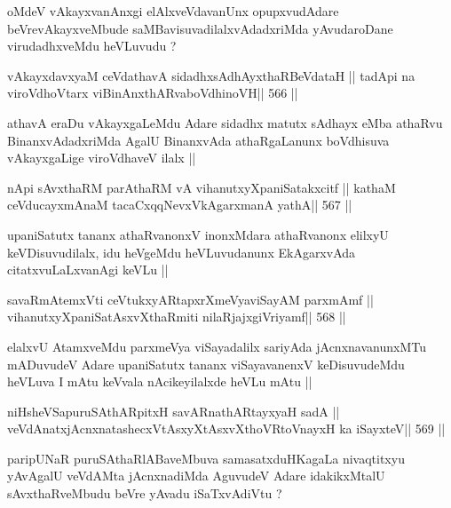 \begin{artha}
oMdeV vAkayxvanAnxgi elAlxveVdavanUnx opupxvudAdare beVrevAkayxveMbude
saMBavisuvadilalxvAdadxriMda yAvudaroDane virudadhxveMdu heVLuvudu ?
\end{artha}

\begin{shl}
vAkayxdavxyaM ceVdathavA sidadhxsAdhAyxthaRBeVdataH ||
tadA\s pi na viroVdhoV\s tarx viBinAnxthARvaboVdhinoVH\hfill || 566 ||
\end{shl}

\begin{artha}
athavA eraDu vAkayxgaLeMdu Adare sidadhx matutx sAdhayx eMba athaRvu
BinanxvAdadxriMda AgalU BinanxvAda athaRgaLanunx boVdhisuva
vAkayxgaLige viroVdhaveV ilalx ||
\end{artha}

\begin{shl}
nApi sAvxthaRM parAthaRM vA vihanutxyXpaniSatakxcitf ||
kathaM ceVducayxmAnaM tacaCxqqNevxVkAgarxmanA yathA\hfill || 567 ||
\end{shl}

\begin{artha}
upaniSatutx tananx athaRvanonxV inonxMdara athaRvanonx elilxyU
keVDisuvudilalx, idu heVgeMdu heVLuvudanunx EkAgarxvAda
citatxvuLaLxvanAgi keVLu ||
\end{artha}

\begin{shl}
savaRmAtemxVti ceVtukxyARtapxrXmeVyaviSayAM parxmAmf ||
vihanutxyXpaniSatAsxvXthaRmiti nilaRjajxgiVriyamf\hfill || 568 ||
\end{shl}

\begin{artha}
elalxvU AtamxveMdu parxmeVya viSayadalilx sariyAda jAcnxnavanunxMTu
mADuvudeV Adare upaniSatutx tananx viSayavanenxV keDisuvudeMdu heVLuva
I mAtu keVvala nAcikeyilalxde heVLu mAtu ||
\end{artha}

\begin{shl}
niHsheVSapuruSAthARpitxH savARnathARtayxyaH sadA ||
veVdAnatxjAcnxnatashecxVtAsxyXtAsxvXthoVR\s toV\s nayxH ka iSayxteV\hfill || 569 ||
\end{shl}

\begin{artha}
paripUNaR puruSAthaRlABaveMbuva samasatxduHKagaLa nivaqtitxyu yAvAgalU
veVdAMta jAcnxnadiMda AguvudeV Adare idakikxMtalU sAvxthaRveMbudu
beVre yAvadu iSaTxvAdiVtu ?
\end{artha}

